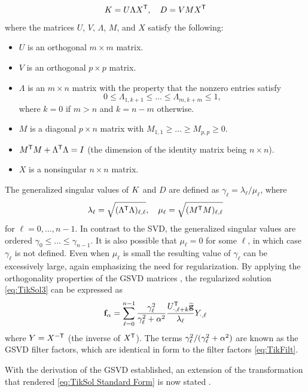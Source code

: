 \begin{equation}
\label{eq:GSVD matrices}
K = U\Lambda {X}^\mathsf{T}, \quad D = VM{X}^\mathsf{T}
\end{equation}
where the matrices $U$, $V$, $\Lambda$, $M$, and $X$ satisfy the following: 
\begin{itemize}
\item $U$ is an orthogonal $m \times m$ matrix. 
\item $V$ is an orthogonal $p \times p$ matrix.
\item $\Lambda$ is an $m \times n$ matrix with the property that the nonzero entries satisfy
\[0 \leq \Lambda_{1,k+1} \leq \ldots \leq \Lambda_{m,k+m} \leq 1,\]
where $k = 0$ if $m > n$ and $k = n-m$ otherwise. 
\item $M$ is a diagonal $p \times n$ matrix with $M_{1,1} \geq \ldots \geq M_{p,p} \geq 0.$
\item ${M}^\mathsf{T} M + {\Lambda}^\mathsf{T} \Lambda = I$ (the dimension of the identity matrix being $n \times n$).
\item $X$ is a nonsingular $n \times n$ matrix.
\end{itemize}
The generalized singular values of $K$ and $D$ are defined as $\gamma_\ell = \lambda_{\ell}/\mu_{\ell}$, where
\begin{equation}
\label{eq:GSVD lambda}
\lambda_\ell = \sqrt{({\Lambda}^\mathsf{T} \Lambda)_{\ell,\ell}}, \quad \mu_\ell = \sqrt{({M}^\mathsf{T} M)_{\ell,\ell}}
\end{equation}
for $\ell = 0,\ldots,{n-1}$. In contrast to the SVD, the generalized singular values are ordered $\gamma_0 \leq \ldots \leq \gamma_{n-1}$. It is also possible that $\mu_\ell = 0$ for some $\ell$, in which case $\gamma_\ell$ is not defined. Even when $\mu_\ell$ is small the resulting value of $\gamma_\ell$ can be excessively large, again emphasizing the need for regularization. By applying the orthogonality properties of the GSVD matrices \cite[p.~105-106]{ABT}, the regularized solution \eqref{eq:TikSol3} can be expressed as
\begin{equation}
\label{eq:TikSol GSVD}
\mathbf{f}_\alpha = \sum_{\ell=0}^{n-1} \frac{\gamma_\ell^2}{\gamma_\ell^2 + \alpha^2} \frac{{U}^\mathsf{T}_{\cdot,\ell+k}\widetilde{\mathbf{g}}}{\lambda_\ell}Y_{\cdot,\ell}
\end{equation}
where $Y = {X}^{-\mathsf{T}}$ (the inverse of ${X}^\mathsf{T}$). The terms $\gamma_\ell^2/(\gamma_\ell^2 + \alpha^2)$ are known as the GSVD filter factors, which are identical in form to the filter factors \eqref{eq:TikFilt}. \par 
With the derivation of the GSVD established, an extension of the transformation that rendered \eqref{eq:TikSol Standard Form} is now stated \cite[p.~38]{Hansen:98}. 

